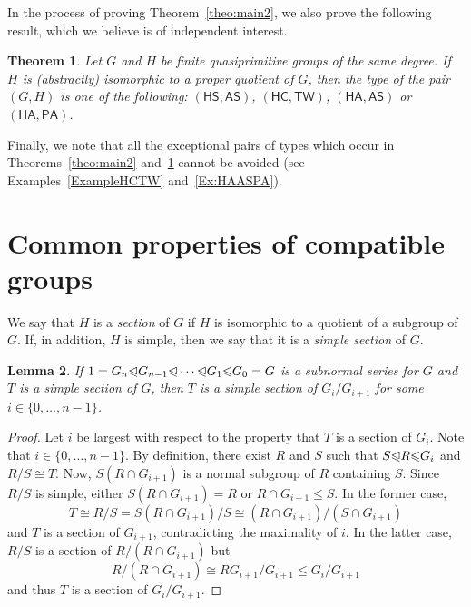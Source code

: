 \documentclass[twoside,12pt,leqno]{amsproc}
\numberwithin{table}{section}
\numberwithin{figure}{section}
\theoremstyle{plain}
\newtheorem{theorem}{Theorem}[section]
\newtheorem{lemma}[theorem]{Lemma}
\theoremstyle{definition}\newtheorem{definition}[theorem]{Definition}
\theoremstyle{definition}\newtheorem{example}[theorem]{Example}
\theoremstyle{definition}\newtheorem{construction}[theorem]{Construction}
\theoremstyle{definition}\newtheorem{remark}[theorem]{Remark}
\theoremstyle{definition}\newtheorem{problem}[theorem]{Problem}
\begin{document}
In the process of proving Theorem~\ref{theo:main2}, we also prove the following result, which we believe is of independent interest.

\begin{theorem}\label{theo:main}
Let $G$ and $H$ be finite quasiprimitive groups of the same degree. If $H$ is (abstractly) isomorphic to a proper quotient of $G$, then the type of the pair $(G,H)$ is one of the following:  $({\mathsf{HS}},{\mathsf{AS}})$, $({\mathsf{HC}},{\mathsf{TW}})$, $({\mathsf{HA}},{\mathsf{AS}})$ or $({\mathsf{HA}},{\mathsf{PA}})$.
\end{theorem}

Finally, we note that all the exceptional pairs of types which occur in Theorems~\ref{theo:main2} and~\ref{theo:main} cannot be avoided (see Examples~\ref{ExampleHCTW} and~\ref{Ex:HAASPA}).

\section{Common properties of compatible groups}\label{sec:prop}

We say that $H$ is a \emph{section} of $G$ if $H$ is isomorphic to a quotient of a subgroup of $G$. If, in addition, $H$ is simple, then we say that it is  a \emph{simple section} of $G$.

\begin{lemma}\label{lem:cf}
If $1=G_n{\trianglelefteqslant} G_{n-1}{\trianglelefteqslant}\cdots{\trianglelefteqslant} G_1{\trianglelefteqslant} G_0=G$ is a subnormal series for $G$ and $T$ is a simple section of $G$, then $T$ is a simple section of $G_i/G_{i+1}$ for some $i\in \{0,\ldots, n-1\}$.
\end{lemma}
\begin{proof}
Let $i$ be largest with respect to the property that $T$ is a section of $G_i$. Note that $i\in \{0,\ldots, n-1\}$. By definition, there exist $R$ and $S$ such that $S{\trianglelefteqslant} R{\leqslant} G_i$ and $R/S\cong T$.  Now, $S(R\cap G_{i+1})$ is a normal subgroup of $R$ containing $S$. Since $R/S$ is simple, either $S(R\cap G_{i+1})=R$ or $R\cap G_{i+1}{\leqslant} S$. In the former case, 
$$T\cong R/S=S(R\cap G_{i+1})/S\cong (R\cap G_{i+1})/(S\cap G_{i+1})$$
and $T$ is a section of $G_{i+1}$, contradicting the maximality of $i$. In the latter case, $R/S$ is a section of $R/(R\cap G_{i+1})$ but
$$R/(R\cap G_{i+1})\cong RG_{i+1}/G_{i+1}{\leqslant} G_i/G_{i+1}$$
and thus $T$ is a section of $G_i/G_{i+1}$. 
\end{proof}
\end{document}
